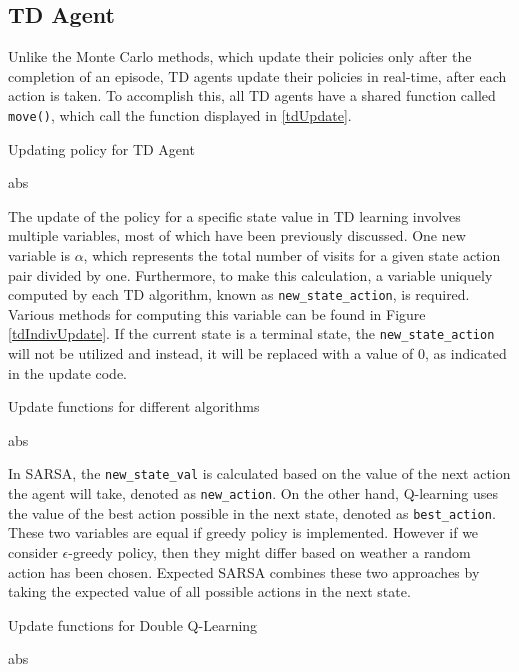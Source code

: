 \subsection{TD Agent}	
Unlike the Monte Carlo methods, which update their policies only after the completion of an episode, TD agents update their policies in real-time, after each action is taken. To accomplish this, all TD agents have a shared function called \texttt{move()}, which call the function displayed in \ref{tdUpdate}. 

\begin{algorithm}
\caption{Updating policy for TD Agent}\label{tdUpdate}
\begin{algorithmic}[1]
\State abs
\end{algorithmic}
\end{algorithm}


The update of the policy for a specific state value in TD learning involves multiple variables, most of which have been previously discussed. One new variable is $\alpha$, which represents the total number of visits for a given state action pair divided by one. Furthermore, to make this calculation, a variable uniquely computed by each TD algorithm, known as \texttt{new\_state\_action}, is required. Various methods for computing this variable can be found in Figure \ref{tdIndivUpdate}. If the current state is a terminal state, the \texttt{new\_state\_action} will not be utilized and instead, it will be replaced with a value of 0, as indicated in the update code.

\begin{algorithm}
\caption{Update functions for different algorithms}\label{tdIndivUpdate}
\begin{algorithmic}
\State abs
\end{algorithmic}
\end{algorithm}

In SARSA, the \texttt{new\_state\_val} is calculated based on the value of the next action the agent will take, denoted as \texttt{new\_action}. On the other hand, Q-learning uses the value of the best action possible in the next state, denoted as \texttt{best\_action}. These two variables are equal if greedy policy is implemented. However if we consider $\epsilon$-greedy policy, then they might differ based on weather a random action has been chosen. Expected SARSA combines these two approaches by taking the expected value of all possible actions in the next state. 

\begin{algorithm}
\caption{Update functions for Double Q-Learning}\label{dqlUpdate}
\begin{algorithmic}
\State abs
\end{algorithmic}
\end{algorithm}

